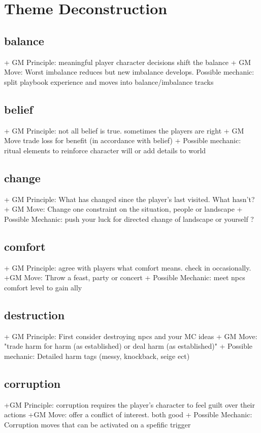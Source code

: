 \documentclass{tufte-handout}
\begin{document}
\section{Theme Deconstruction}\label{themedecon}
\begin{multicols}{2}
\subsection{balance}
+ GM Principle: meaningful player character decisions shift the balance
+ GM Move: Worst imbalance reduces but new imbalance develops.	
Possible mechanic: split playbook experience and moves into balance/imbalance tracks

\subsection{belief}
+ GM Principle: not all belief is true. sometimes the players are right
+ GM Move trade loss for benefit (in accordance with belief)
+ Possible mechanic: ritual elements to reinforce character will or add details to world

\subsection{change}
+ GM Principle: What has changed since the player's last visited. What hasn't?	
+ GM Move: Change one constraint on the situation, people or landscape
+ Possible Mechanic: push your luck for directed change of landscape or yourself ?

\subsection{comfort}
+ GM Principle: agree with players what comfort means. check in occasionally.
+GM Move: Throw a feast, party or concert
+ Possible Mechanic: meet npcs comfort level to gain ally

\subsection{destruction }
+ GM Principle: First consider destroying npcs and your MC ideas	
+ GM Move: "trade harm for harm (as established) or deal harm (as established)"	
+ Possible mechanic: Detailed harm tags (messy, knockback, seige ect)


\subsection{corruption}
+GM Principle: corruption requires the player's character to feel guilt over their actions	
+GM Move:  offer a conflict of interest. both good	
+ Possible Mechanic: Corruption moves that can be activated on a spefific trigger


\end{multicols}
\end{document}
